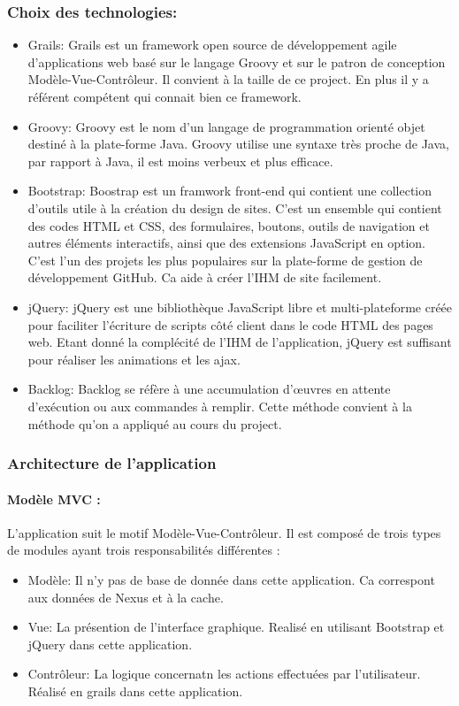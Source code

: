 \subsubsection*{Choix des technologies:}
\begin{itemize}
 \item Grails:
       Grails est un framework open source de développement agile d'applications web basé sur le langage Groovy et sur le patron de conception Modèle-Vue-Contrôleur.
       Il convient à la taille de ce project. En plus il y a référent compétent qui connait bien ce framework.
 \item Groovy:
       Groovy est le nom d'un langage de programmation orienté objet destiné à la plate-forme Java.
       Groovy utilise une syntaxe très proche de Java, par rapport à Java, il est moins verbeux et plus efficace.
 \item Bootstrap:
       Boostrap est un framwork front-end qui contient  une collection d'outils utile à la création du design de sites. C'est un ensemble qui contient des codes HTML et CSS, des formulaires, boutons, outils de navigation et autres éléments interactifs, ainsi que des extensions JavaScript en option. C'est l'un des projets les plus populaires sur la plate-forme de gestion de développement GitHub.
       Ca aide à créer l'IHM de site facilement.
 \item jQuery:
       jQuery est une bibliothèque JavaScript libre et multi-plateforme créée pour faciliter l'écriture de scripts côté client dans le code HTML des pages web.
       Etant donné la complécité de l'IHM de l'application, jQuery est suffisant pour réaliser les animations et les ajax.
 \item Backlog:
       Backlog se réfère à une accumulation d'œuvres en attente d'exécution ou aux commandes à remplir.
       Cette méthode convient à la méthode qu'on a appliqué au cours du project.
\end{itemize}


\subsubsection*{Architecture de l'application}
\paragraph{Modèle MVC :}
L'application suit le motif Modèle-Vue-Contrôleur.
Il est composé de  trois types de modules ayant trois responsabilités différentes :
\begin{itemize}
 \item Modèle: Il n'y pas de base de donnée dans cette application. Ca correspont aux données de Nexus et à la cache.
 \item Vue: La présention de l'interface graphique. Realisé en utilisant Bootstrap et jQuery dans cette application.
 \item Contrôleur: La logique concernatn les actions effectuées par l'utilisateur. Réalisé en grails dans cette application.
\end{itemize}

